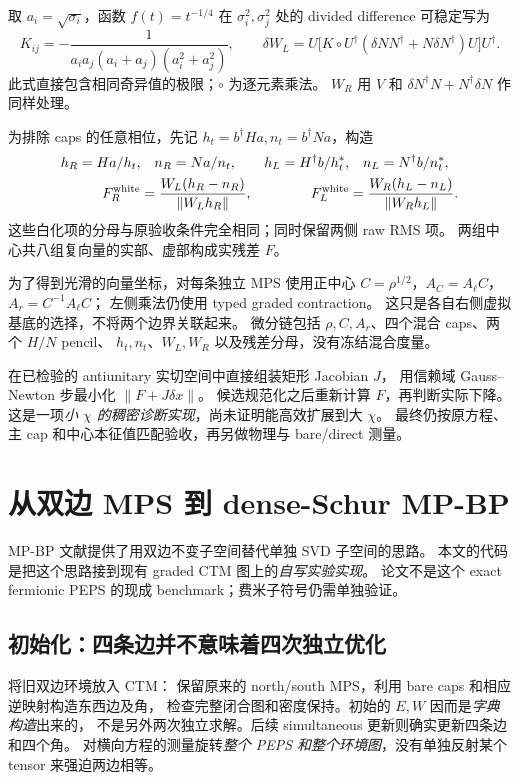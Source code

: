 \documentclass[11pt]{article}
\begin{document}
取 $a_i=\sqrt{\sigma_i}$，函数 $f(t)=t^{-1/4}$ 在
$\sigma_i^2,\sigma_j^2$ 处的 divided difference 可稳定写为
\begin{equation}
 K_{ij}=-\frac1{a_i a_j(a_i+a_j)(a_i^2+a_j^2)},\qquad
 \delta W_L=U\big[K\circ U^\dagger(\delta N N^\dagger+N\delta N^\dagger)U\big]U^\dagger.
\end{equation}
此式直接包含相同奇异值的极限；$\circ$ 为逐元素乘法。
$W_R$ 用 $V$ 和 $\delta N^\dagger N+N^\dagger\delta N$ 作同样处理。

为排除 caps 的任意相位，先记 $h_t=b^\dagger Ha,n_t=b^\dagger Na$，构造
\begin{align}
 h_R=Ha/h_t,&\quad n_R=Na/n_t, &
 h_L=H^\dagger b/h_t^*,&\quad n_L=N^\dagger b/n_t^*,\\
 F_R^{\rm white}&=\frac{W_L(h_R-n_R)}{\|W_Lh_R\|},&
 F_L^{\rm white}&=\frac{W_R(h_L-n_L)}{\|W_Rh_L\|}.
\end{align}
这些白化项的分母与原验收条件完全相同；同时保留两侧 raw RMS 项。
两组中心共八组复向量的实部、虚部构成实残差 $F$。

为了得到光滑的向量坐标，对每条独立 MPS 使用正中心
$C=\rho^{1/2}$，$A_C=A_\ell C$，$A_r=C^{-1}A_\ell C$；
左侧乘法仍使用 typed graded contraction。
这只是各自右侧虚拟基底的选择，不将两个边界关联起来。
微分链包括 $\rho,C,A_r$、四个混合 caps、两个 $H/N$ pencil、
$h_t,n_t$、$W_L,W_R$ 以及残差分母，没有冻结混合度量。

在已检验的 antiunitary 实切空间中直接组装矩形 Jacobian $J$，
用信赖域 Gauss--Newton 步最小化 $\|F+J\delta x\|$。
候选规范化之后重新计算 $F$，再判断实际下降。
这是一项\emph{小 $\chi$ 的稠密诊断实现}，尚未证明能高效扩展到大 $\chi$。
最终仍按原方程、主 cap 和中心本征值匹配验收，再另做物理与 bare/direct 测量。

\section{从双边 MPS 到 dense-Schur MP-BP}
\label{sec:mpbp}
MP-BP 文献\cite{mpbp}提供了用双边不变子空间替代单独 SVD 子空间的思路。
本文的代码是把这个思路接到现有 graded CTM 图上的\emph{自写实验实现}。
论文不是这个 exact fermionic PEPS 的现成 benchmark；费米子符号仍需单独验证。

\subsection{初始化：四条边并不意味着四次独立优化}
 将旧双边环境放入 CTM：
保留原来的 north/south MPS，利用 bare caps 和相应逆映射构造东西边及角，
检查完整闭合图和密度保持。初始的 $E,W$ 因而是\emph{字典构造}出来的，
不是另外两次独立求解。后续 simultaneous 更新则确实更新四条边和四个角。
对横向方程的测量旋转\emph{整个 PEPS 和整个环境图}，没有单独反射某个 tensor 来强迫两边相等。
\end{document}
